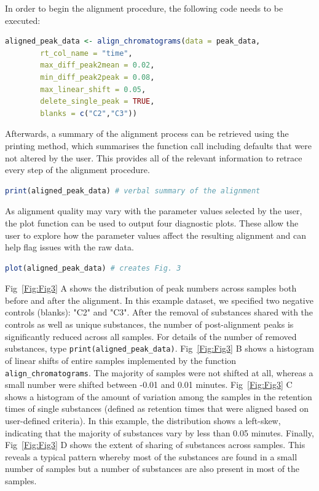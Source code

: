 \documentclass[10pt,letterpaper]{article}
\begin{document}
In order to begin the alignment procedure, the following code needs to be executed:

\begin{lstlisting}[language=R]
aligned_peak_data <- align_chromatograms(data = peak_data,
        rt_col_name = "time",
        max_diff_peak2mean = 0.02, 
        min_diff_peak2peak = 0.08, 
        max_linear_shift = 0.05, 
        delete_single_peak = TRUE, 
        blanks = c("C2","C3")) 
\end{lstlisting}

Afterwards, a summary of the alignment process can be retrieved using the printing method, which summarises the function call including defaults that were not altered by the user. This provides all of the relevant information to retrace every step of the alignment procedure.

\begin{lstlisting}[language=R]
print(aligned_peak_data) # verbal summary of the alignment
\end{lstlisting}

As alignment quality may vary with the parameter values selected by the user, the plot function can be used to output four diagnostic plots.  These allow the user to explore how the parameter values affect the resulting alignment and can help flag issues with the raw data.

\begin{lstlisting}[language=R]
plot(aligned_peak_data) # creates Fig. 3
\end{lstlisting}

Fig~\ref{Fig:Fig3} A shows the distribution of peak numbers across samples both before and after the alignment.  In this example dataset, we specified two negative controls (blanks): "C2" and "C3".  After the removal of substances shared with the controls as well as unique substances, the number of post-alignment peaks is significantly reduced across all samples.  For details of the number of removed substances, type \texttt{print(aligned\_peak\_data)}. Fig~\ref{Fig:Fig3} B shows a histogram of linear shifts of entire samples implemented by the function \texttt{align\_chromatograms}. The majority of samples were not shifted at all, whereas a small number were shifted between -0.01 and 0.01 minutes. Fig~\ref{Fig:Fig3} C shows a histogram of the amount of variation among the samples in the retention times of single substances (defined as retention times that were aligned based on user-defined criteria). In this example, the distribution shows a left-skew, indicating that the majority of substances vary by less than 0.05 minutes. Finally, Fig~\ref{Fig:Fig3} D shows the extent of sharing of substances across samples. This reveals a typical pattern whereby most of the substances are found in a small number of samples but a number of substances are also present in most of the samples. \par	
\end{document}
